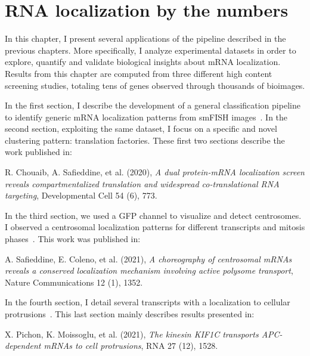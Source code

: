 
\graphicspath{{./figures/chapter5/}}

\chapter{RNA localization by the numbers}
\label{ch:chapter5}

\minitoc
\newpage

In this chapter, I present several applications of the pipeline described in the previous chapters.
More specifically, I analyze experimental datasets in order to explore, quantify and validate biological insights about \ac{mRNA} localization.
Results from this chapter are computed from three different high content screening studies, totaling tens of genes observed through thousands of bioimages.

In the first section, I describe the development of a general classification pipeline to identify generic \ac{mRNA} localization patterns from \ac{smFISH} images~\cite{CHOUAIB_2020}.
In the second section, exploiting the same dataset, I focus on a specific and novel clustering pattern: translation factories.
These first two sections describe the work published in:

\begin{center}
	\color{green}
	R. Chouaib, A. Safieddine, et al. (2020), \textit{A dual protein-mRNA localization screen reveals compartmentalized translation and widespread co-translational RNA targeting}, Developmental Cell 54 (6), 773.
\end{center}

In the third section, we used a \ac{GFP} channel to visualize and detect centrosomes.
I observed a centrosomal localization patterns for different transcripts and mitosis phases~\cite{safieddine_choreography_2021}.
This work was published in:

\begin{center}
	\color{green}
	A. Safieddine, E. Coleno, et al. (2021), \textit{A choreography of centrosomal mRNAs reveals a conserved localization mechanism involving active polysome transport}, Nature Communications 12 (1), 1352.
\end{center}

In the fourth section, I detail several transcripts with a localization to cellular protrusions~\cite{pichon_kinesin_2021}.
This last section mainly describes results presented in:

\begin{center}
	\color{green}
	X. Pichon, K. Moissoglu, et al. (2021), \textit{The kinesin KIF1C transports APC-dependent mRNAs to cell protrusions}, RNA 27 (12), 1528.
\end{center}

